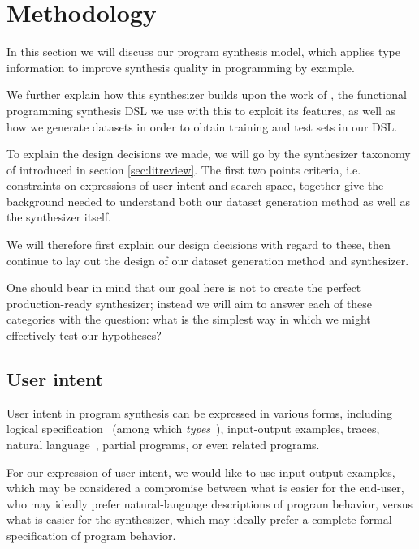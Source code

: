 \documentclass{article}
\begin{document}


\section{Methodology} %

In this section we will discuss our program synthesis model,
which applies type information to improve synthesis quality in programming by example.

We further explain how this synthesizer builds upon the work of \citet{nsps},
the functional programming synthesis DSL we use with this to exploit its features,
as well as how we generate datasets in order to obtain training and test sets in our DSL.

To explain the design decisions we made,
we will go by the synthesizer taxonomy of \citet{gulwani2017program} introduced in section \ref{sec:litreview}.
The first two points criteria, i.e. constraints on expressions of user intent and search space,
together give the background needed to understand both our dataset generation method as well as the synthesizer itself.

We will therefore first explain our design decisions with regard to these,
then continue to lay out the design of our dataset generation method and synthesizer.

One should bear in mind that our goal here is not to create the perfect production-ready synthesizer;
instead we will aim to answer each of these categories with the question:
what is the simplest way in which we might effectively test our hypotheses?

\subsection{User intent}

User intent in program synthesis can be expressed in various forms, including logical specification~\citep{temporalstreamlogic} (among which \emph{types}~\citep{synquid}),
input-output examples, traces, natural language~\citep{abstractsyntaxnetworks},
partial programs, or even related programs.~\citep{gulwani2017program}

For our expression of user intent, we would like to use input-output examples,
which may be considered a compromise between what is easier for the end-user,
who may ideally prefer natural-language descriptions of program behavior,
versus what is easier for the synthesizer,
which may ideally prefer a complete formal specification of program behavior.
\end{document}

